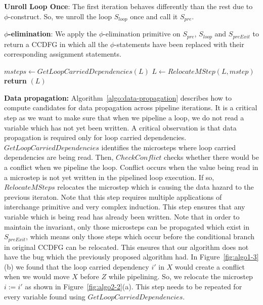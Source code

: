 {\bf Unroll Loop Once}: The first iteration behaves differently than the rest due to $\phi$-construct. So, we unroll the loop $S_{loop}$ once and call it $S_{pre}$. 

{\bf $\phi$-elimination}: We apply the $\phi$-elimination primitive on $S_{pre}$, $S_{loop}$ and $S_{preExit}$ to return a CCDFG in which all the $\phi$-statements have been replaced with their corresponding assignment statements. 

\begin{algorithm}
\caption{Data propagation} 
\label{algo:data-propagation}
\begin{algorithmic}[1]
\State $msteps \leftarrow GetLoopCarriedDependencies(L)$
\State $L \leftarrow RelocateMStep (L, mstep)$
\EndIf
\EndFor
\State \textbf{return} $(L)$
\EndProcedure
\end{algorithmic}
\end{algorithm}

{\bf Data propagation:} Algorithm~\ref{algo:data-propagation} describes how to compute candidates for data
propagation across pipeline iterations. It is a critical step as we want to make sure that when we pipeline a loop, we do not read a variable which has not
yet been written. A critical observation is that data propagation is required only for loop carried dependencies.
$GetLoopCarriedDependencies$ identifies the microsteps where loop carried dependencies are being read. Then,
$CheckConflict$ checks whether there would be a conflict when we pipeline the loop. Conflict occurs when the value being read in a microstep is not yet written in the pipelined loop execution. If so, $RelocateMSteps$ relocates the microstep which is causing the data hazard to the previous iteraton. Note that this step requires multiple applications of interchange primitive and very complex induction. This step ensures that any variable which is being read has already been written. Note that in order to maintain the invariant, only those microsteps can be propagated which exist in $S_{preExit}$, which means only those steps which occur before the conditional branch in original CCDFG can be relocated. This ensures that our algorithm does not have the bug which the previously proposed algorithm had. In Figure~\ref{fig:algo1-3}(b) we found that the loop carried dependency $i'$ in $X$ would create a conflict when we would move $X$ before $Z$ while pipelining. So, we relocate the microstep $i := i'$ as shown in Figure~\ref{fig:algo2-2}(a). This step needs to be repeated for every variable found using $GetLoopCarriedDependencies$.

